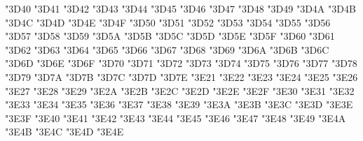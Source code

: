 {\Uchar\jis"3D40 %
\Uchar\jis"3D41 %
\Uchar\jis"3D42 %
\Uchar\jis"3D43 %
\Uchar\jis"3D44 %
\Uchar\jis"3D45 %
\Uchar\jis"3D46 %
\Uchar\jis"3D47 %
\Uchar\jis"3D48 %
\Uchar\jis"3D49 %
\Uchar\jis"3D4A %
\Uchar\jis"3D4B %
\Uchar\jis"3D4C %
\Uchar\jis"3D4D %
\Uchar\jis"3D4E %
\Uchar\jis"3D4F %
\Uchar\jis"3D50 %
\Uchar\jis"3D51 %
\Uchar\jis"3D52 %
\Uchar\jis"3D53 %
\Uchar\jis"3D54 %
\Uchar\jis"3D55 %
\Uchar\jis"3D56 %
\Uchar\jis"3D57 %
\Uchar\jis"3D58 %
\Uchar\jis"3D59 %
\Uchar\jis"3D5A %
\Uchar\jis"3D5B %
\Uchar\jis"3D5C %
\Uchar\jis"3D5D %
\Uchar\jis"3D5E %
\Uchar\jis"3D5F %
\Uchar\jis"3D60 %
\Uchar\jis"3D61 %
\Uchar\jis"3D62 %
\Uchar\jis"3D63 %
\Uchar\jis"3D64 %
\Uchar\jis"3D65 %
\Uchar\jis"3D66 %
\Uchar\jis"3D67 %
\Uchar\jis"3D68 %
\Uchar\jis"3D69 %
\Uchar\jis"3D6A %
\Uchar\jis"3D6B %
\Uchar\jis"3D6C %
\Uchar\jis"3D6D %
\Uchar\jis"3D6E %
\Uchar\jis"3D6F %
\Uchar\jis"3D70 %
\Uchar\jis"3D71 %
\Uchar\jis"3D72 %
\Uchar\jis"3D73 %
\Uchar\jis"3D74 %
\Uchar\jis"3D75 %
\Uchar\jis"3D76 %
\Uchar\jis"3D77 %
\Uchar\jis"3D78 %
\Uchar\jis"3D79 %
\Uchar\jis"3D7A %
\Uchar\jis"3D7B %
\Uchar\jis"3D7C %
\Uchar\jis"3D7D %
\Uchar\jis"3D7E %
\Uchar\jis"3E21 %
\Uchar\jis"3E22 %
\Uchar\jis"3E23 %
\Uchar\jis"3E24 %
\Uchar\jis"3E25 %
\Uchar\jis"3E26 %
\Uchar\jis"3E27 %
\Uchar\jis"3E28 %
\Uchar\jis"3E29 %
\Uchar\jis"3E2A %
\Uchar\jis"3E2B %
\Uchar\jis"3E2C %
\Uchar\jis"3E2D %
\Uchar\jis"3E2E %
\Uchar\jis"3E2F %
\Uchar\jis"3E30 %
\Uchar\jis"3E31 %
\Uchar\jis"3E32 %
\Uchar\jis"3E33 %
\Uchar\jis"3E34 %
\Uchar\jis"3E35 %
\Uchar\jis"3E36 %
\Uchar\jis"3E37 %
\Uchar\jis"3E38 %
\Uchar\jis"3E39 %
\Uchar\jis"3E3A %
\Uchar\jis"3E3B %
\Uchar\jis"3E3C %
\Uchar\jis"3E3D %
\Uchar\jis"3E3E %
\Uchar\jis"3E3F %
\Uchar\jis"3E40 %
\Uchar\jis"3E41 %
\Uchar\jis"3E42 %
\Uchar\jis"3E43 %
\Uchar\jis"3E44 %
\Uchar\jis"3E45 %
\Uchar\jis"3E46 %
\Uchar\jis"3E47 %
\Uchar\jis"3E48 %
\Uchar\jis"3E49 %
\Uchar\jis"3E4A %
\Uchar\jis"3E4B %
\Uchar\jis"3E4C %
\Uchar\jis"3E4D %
\Uchar\jis"3E4E %
}
